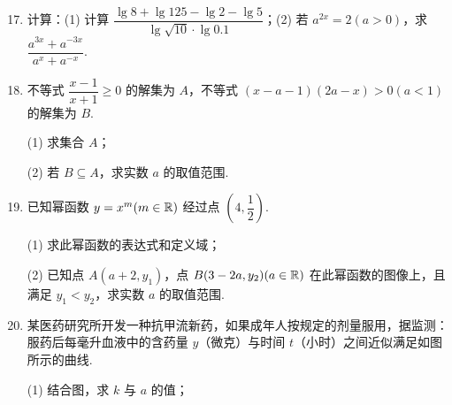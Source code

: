 
\begin{enumerate}
\setcounter{enumi}{16}

\item 计算：(1) 计算 $\dfrac{\lg8+\lg125-\lg2-\lg5}{\lg\sqrt{10}\cdot\lg0.1}$；(2) 若 $a^{2x}=2(a>0)$，求 $\dfrac{a^{3x}+a^{-3x}}{a^x+a^{-x}}$.

\ifanswer
\solbegin
{}
\solend
\fi

\item 不等式 $\dfrac{x-1}{x+1}\geqslant0$ 的解集为 $A$，不等式 $(x-a-1)(2a-x)>0(a<1)$ 的解集为 $B$.

(1) 求集合 $A$；

(2) 若 $B\subseteq A$，求实数 $a$ 的取值范围.

\ifanswer
\solbegin
\step{(1) $A=(-\infty,-1)\cup[1,+\infty)$.}
\step{而 $a<1$，所以实数 $a$ 的取值范围 $(-\infty,-2]\cup\left[\dfrac12,1\right)$.}%
\solend
\fi

\item 已知幂函数 $y=x^m(m\in\mathbb{R})$ 经过点 $\left(4,\dfrac12\right)$.

(1) 求此幂函数的表达式和定义域；

(2) 已知点 $A(a+2,y_1)$，点 $B(3-2a,y_2)(a\in\mathbb{R})$ 在此幂函数的图像上，且满足 $y_1<y_2$，求实数 $a$ 的取值范围.

\ifanswer
\solbegin
{}
\step{由 $y_1<y_2$，得 $a+2>3-2a\geqslant0\Rightarrow a\in\left(\dfrac13,\dfrac32\right]$.}
\solend
\fi

\item 某医药研究所开发一种抗甲流新药，如果成年人按规定的剂量服用，据监测：服药后每毫升血液中的含药量 $y$（微克）与时间 $t$（小时）之间近似满足如图所示的曲线.

(1) 结合图，求 $k$ 与 $a$ 的值；


\end{enumerate}
